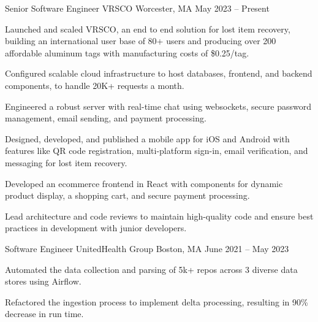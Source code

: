 

\begin{cventries}

  \cventry
    {Senior Software Engineer} %
    {VRSCO} %
    {Worcester, MA} %
    {May 2023 – Present}
    {
      \begin{cvitems} %
      \item {Launched and scaled VRSCO, an end to end solution for lost item recovery, building an international user base of 80+ users and producing over 200 affordable aluminum tags with manufacturing costs of \$0.25/tag.}
      \item {Configured scalable cloud infrastructure to host databases, frontend, and backend components, to handle 20K+ requests a month.}
      \item {Engineered a robust server with real-time chat using websockets, secure password management, email sending, and payment processing.}
      \item {Designed, developed, and published a mobile app for iOS and Android with features like QR code registration, multi-platform sign-in, email verification, and messaging for lost item recovery.}
      \item {Developed an ecommerce frontend in React with components for dynamic product display, a shopping cart, and secure payment processing.}
      \item {Lead architecture and code reviews to maintain high-quality code and ensure best practices in development with junior developers.}
      \end{cvitems}
    }
  \cventry
    {Software Engineer} %
    {UnitedHealth Group} %
    {Boston, MA} %
    {June 2021 – May 2023} %
    {
      \begin{cvitems} %
        \item {Automated the data collection and parsing of 5k+ repos across 3 diverse data stores using Airflow.}
        \item {Refactored the ingestion process to implement delta processing, resulting in 90\% decrease in run time.}

\end{cvitems}}
\end{cventries}
